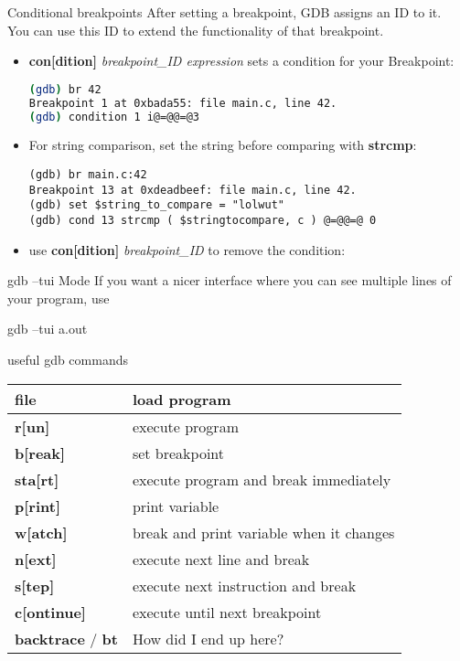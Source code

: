 \documentclass[10pt,graphics,aspectratio=169,table]{beamer}
\begin{document}
\begin{frame}[fragile]{Conditional breakpoints}
After setting a breakpoint, GDB assigns an ID to it.\\
You can use this ID to extend the functionality of that breakpoint.
	\begin{itemize}
		\item \textbf{con[dition]} \textit{breakpoint\_ID expression} sets a condition for your Breakpoint:
		\begin{lstlisting}[numbers=none,language=bash]
(gdb) br 42
Breakpoint 1 at 0xbada55: file main.c, line 42.
(gdb) condition 1 i@=@@=@3
        \end{lstlisting}
		\item For string comparison, set the string before comparing with \textbf{strcmp}:
		\begin{lstlisting}
(gdb) br main.c:42
Breakpoint 13 at 0xdeadbeef: file main.c, line 42.
(gdb) set $string_to_compare = "lolwut"
(gdb) cond 13 strcmp ( $stringtocompare, c ) @=@@=@ 0
        \end{lstlisting}
        \item use \textbf{con[dition]} \textit{breakpoint\_ID} to remove the condition:
	\end{itemize}
\end{frame}

\begin{frame}[fragile]{gdb --tui Mode}
    If you want a nicer interface where you can see multiple lines of your program,
    use 
    \begin{codeblock}
gdb --tui a.out
    \end{codeblock}

\end{frame}

\begin{frame}{useful gdb commands}
    \begin{tabular}{|l|l|}
        \hline
        \textbf{file} & load program\\\hline
        \textbf{r[un]} & execute program\\\hline
        \textbf{b[reak]} & set breakpoint\\\hline
        \textbf{sta[rt]} & execute program and break immediately\\\hline
        \textbf{p[rint]} & print variable\\\hline
        \textbf{w[atch]} & break and print variable when it changes\\\hline
        \textbf{n[ext]} & execute next line and break\\\hline
        \textbf{s[tep]} & execute next instruction and break\\\hline
        \textbf{c[ontinue]} & execute until next breakpoint\\\hline
        \textbf{backtrace} / \textbf{bt} & How did I end up here?\\\hline
    \end{tabular}
\end{frame}
\end{document}

